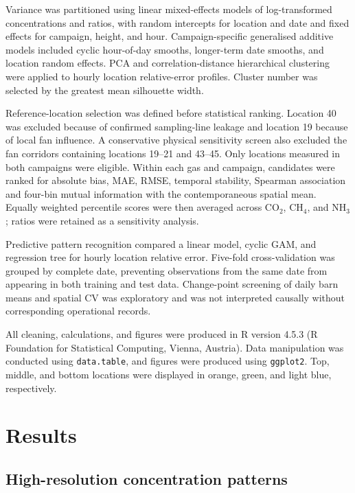 \documentclass[12pt,a4paper]{article}
\begin{document}
Variance was partitioned using linear mixed-effects models of log-transformed
concentrations and ratios, with random intercepts for location and date and
fixed effects for campaign, height, and hour. Campaign-specific generalised
additive models included cyclic hour-of-day smooths, longer-term date smooths,
and location random effects. PCA and correlation-distance hierarchical
clustering were applied to hourly location relative-error profiles. Cluster
number was selected by the greatest mean silhouette width.

Reference-location selection was defined before statistical ranking. Location
40 was excluded because of confirmed sampling-line leakage and location 19
because of local fan influence. A conservative physical sensitivity screen
also excluded the fan corridors containing locations 19--21 and 43--45. Only
locations measured in both campaigns were eligible. Within each gas and
campaign, candidates were ranked for absolute bias, MAE, RMSE, temporal
stability, Spearman association and four-bin mutual information with the
contemporaneous spatial mean. Equally weighted percentile scores were then
averaged across \(\mathrm{CO_2}\), \(\mathrm{CH_4}\), and
\(\mathrm{NH_3}\); ratios were retained as a sensitivity analysis.

Predictive pattern recognition compared a linear model, cyclic GAM, and
regression tree for hourly location relative error. Five-fold cross-validation
was grouped by complete date, preventing observations from the same date from
appearing in both training and test data. Change-point screening of daily barn
means and spatial CV was exploratory and was not interpreted causally without
corresponding operational records.

All cleaning, calculations, and figures were produced in R version 4.5.3
(R Foundation for Statistical Computing, Vienna, Austria). Data manipulation
was conducted using \texttt{data.table}, and figures were produced using
\texttt{ggplot2}. Top, middle, and bottom locations were displayed in orange,
green, and light blue, respectively.

\section{Results}

\subsection{High-resolution concentration patterns}
\end{document}
